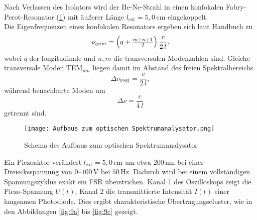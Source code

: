 Nach Verlassen des Isolators wird der He-Ne-Strahl in einen konfokalen Fabry-Perot-Resonator (\cref{fig:Spektrumanalysator}) mit äußerer Länge $l_{\mathrm{ext}} = 5{,}0\,\si{\centi\meter}$ eingekoppelt. \\
Die Eigenfrequenzen eines konfokalen Resonators ergeben sich laut Handbuch \cite{praktikum} zu
\begin{equation}
  \nu_{qnm}
  = \Bigl(q + \tfrac{m+n+1}{2}\Bigr)\,\frac{c}{2\,l} .
\end{equation}
wobei \( q \) der longitudinale und \( n, m \) die transversalen Modenzahlen sind. 
Gleiche transversale Moden TEM$_{nm}$ liegen damit im Abstand des freien Spektralbereichs
\begin{equation*}
  \Delta\nu_{\mathrm{FSR}}
  = \frac{c}{2\,l},
\end{equation*}
während benachbarte Moden um
\begin{equation*}
  \Delta\nu
  = \frac{c}{4\,l}
\end{equation*}
getrennt sind.
\begin{figure}[htbp]
  \centering
  \texttt{[image: Aufbaus zum optischen Spektrumanalysator.png]}
  \caption{Schema des Aufbaus zum optischen Spektrumanalysator \cite{praktikum}}
  \label{fig:Spektrumanalysator}
\end{figure}
Ein Piezoaktor verändert \( l_{\mathrm{ext}} = 5{,}0\,\si{\centi\meter} \) um etwa \(200\,\si{\nano\meter}\) bei einer Dreiecksspannung von $0$–$100\,\si{\volt}$ bei $50\,\si{\hertz}$. 
Dadurch wird bei einem vollständigen Spannungszyklus exakt ein FSR überstrichen. 
Kanal 1 des Oszilloskops zeigt die Piezo-Spannung \( U(t) \), Kanal 2 die transmittierte Intensität \( I(t) \) einer langsamen Photodiode. 
Dies ergibt charakteristische Übertragungscluster, wie in den Abbildungen \cref{fig:9a} bis \cref{fig:9c} gezeigt.

